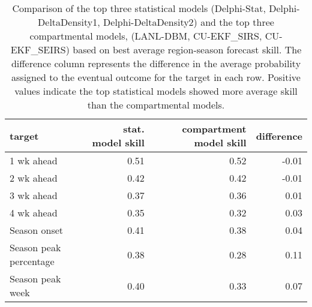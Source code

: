 \begin{table}[ht]
\centering
\begin{tabular}{lrrr}
  \hline
target & stat. model skill & compartment model skill & difference \\ 
  \hline
1 wk ahead & 0.51 & 0.52 & -0.01 \\ 
  2 wk ahead & 0.42 & 0.42 & -0.01 \\ 
  3 wk ahead & 0.37 & 0.36 & 0.01 \\ 
  4 wk ahead & 0.35 & 0.32 & 0.03 \\ 
  Season onset & 0.41 & 0.38 & 0.04 \\ 
  Season peak percentage & 0.38 & 0.28 & 0.11 \\ 
  Season peak week & 0.40 & 0.33 & 0.07 \\ 
   \hline
\end{tabular}
\caption{Comparison of the top three statistical models (Delphi-Stat, Delphi-DeltaDensity1, Delphi-DeltaDensity2) and the top three compartmental models, (LANL-DBM, CU-EKF\_SIRS, CU-EKF\_SEIRS) based on best average region-season forecast skill. The difference column represents the difference in the average probability assigned to the eventual outcome for the target in each row. Positive values indicate the top statistical models showed more average skill than the compartmental models.} 
\label{tab:score-by-model-type}
\end{table}
